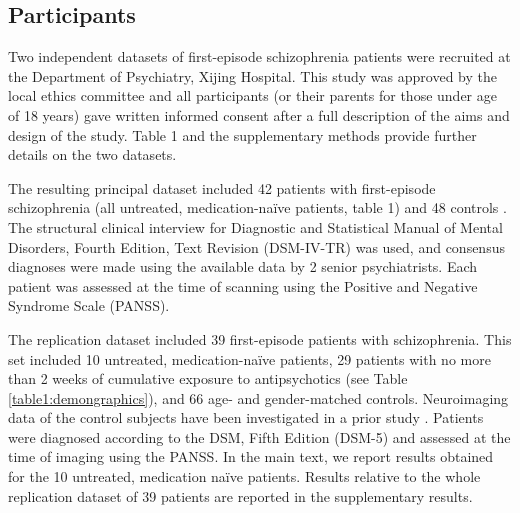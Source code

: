 \begin{refsection}
\subsection*{Participants}
Two independent datasets of first-episode schizophrenia patients were recruited at the Department of Psychiatry, Xijing Hospital. This study was approved by the local ethics committee and all participants (or their parents for those under age of 18 years) gave written informed consent after a full description of the aims and design of the study. Table 1 and the supplementary methods provide further details on the two datasets.

The resulting principal dataset included 42 patients with first-episode schizophrenia (all untreated, medication-na\"{i}ve patients, table 1) and 48 controls \citep{Cui2017AberrantPA,Cui2018DiseaseDF}. The structural clinical interview for Diagnostic and Statistical Manual of Mental Disorders, Fourth Edition, Text Revision (DSM-IV-TR) was used, and consensus diagnoses were made using the available data by 2 senior psychiatrists. Each patient was assessed at the time of scanning using the Positive and Negative Syndrome Scale (PANSS).

The replication dataset included 39 first-episode patients with schizophrenia. This set included 10 untreated, medication-na\"{i}ve patients, 29 patients with no more than 2 weeks of cumulative exposure to antipsychotics (see Table \ref{table1:demongraphics}), and 66 age- and gender-matched controls. Neuroimaging data of the control subjects have been investigated in a prior study \citep{Cui2018DiseaseDF}. Patients were diagnosed according to the DSM, Fifth Edition (DSM-5) and assessed at the time of imaging using the PANSS. In the main text, we report results obtained for the 10 untreated, medication na\"{i}ve patients. Results relative to the whole replication dataset of 39 patients are reported in the supplementary results.


\end{refsection}
